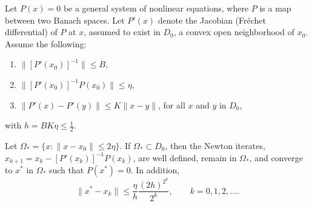 \documentclass[final]{statsoc}
\begin{document}
\begin{lemma}\label{L:kantorovich}
    Let $P(x) = 0$ be a general system of nonlinear equations, where $P$ is
    a map between two Banach spaces.  Let $P'(x)$ denote the Jacobian
    (Fr\'echet differential) of $P$ at $x$, assumed to exist in $D_0$,
    a convex open neighborhood of $x_0$.  Assume the following:
    \begin{enumerate}
        \item $\| [P'(x_0)]^{-1} \| \leq B$,
        \item $\| [P'(x_0)]^{-1} P(x_0) \| \leq \eta$,
        \item $\| P'(x) - P'(y) \| \leq K \| x - y \|$,\quad
            for all $x$ and $y$ in $D_0$,
    \end{enumerate}
    with $h = B K \eta \leq \tfrac{1}{2}$.

    Let $\Omega_\ast = \{ x : \| x - x_0 \| \leq 2 \eta \}$.
    If $\Omega_\ast \subset D_0$, then the Newton iterates,
    $x_{k+1} = x_k - [P'(x_k)]^{-1} P(x_k)$, are well defined, remain
    in $\Omega_\ast$, and converge to $x^\ast$ in $\Omega_\ast$ such
    that $P(x^\ast) = 0$.  In addition,
    \[
        \| x^\ast - x_k \|
            \leq
                \frac{\eta}{h}
                \frac{(2h)^{2^k}}{2^k},
        \qquad
        k = 0, 1, 2, \ldots.
    \]
\end{lemma}
\end{document}
